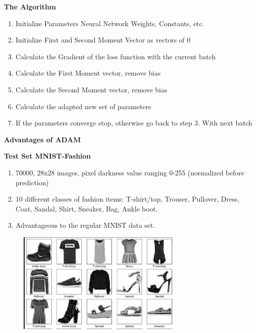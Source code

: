 \documentclass{beamer}
\newcommand\myheading[1]{%
  \par\bigskip
  {\Large\bfseries#1}\par\smallskip}
\begin{document}
\begin{frame}
    \myheading{The Algorithm}
    \begin{enumerate}
        \item Initialize Parameters
        Neural Network Weights, Constants, etc.
        \item Initialize First and Second Moment Vector as vectors of 0
        \item Calculate the Gradient of the loss function with the current batch
        \item Calculate the First Moment vector, remove bias
        \item Calculate the Second Moment vector, remove bias
        \item Calculate the adapted new set of parameters
        \item If the parameters converge stop, otherwise go back to step 3. With next batch
    \end{enumerate}
\end{frame}




\begin{frame}
    \myheading{Advantages of ADAM}
\end{frame}

\begin{frame}
    \myheading{Test Set MNIST-Fashion}
    \begin{enumerate}
        \item 70000, 28x28 images, pixel darkness value ranging 0-255 (normalized before prediction)
        \item 10 different classes of fashion items: T-shirt/top, Trouser, Pullover, Dress, Coat,
               Sandal, Shirt, Sneaker, Bag, Ankle boot.
        \item Advantageous to the regular MNIST data set. 
    \end{enumerate}
\end{frame}

\begin{frame}
     \begin{figure}[h]
        \includegraphics[width=8cm]{report/figures/example_items.pdf}
    \end{figure}
\end{frame}
\end{document}
